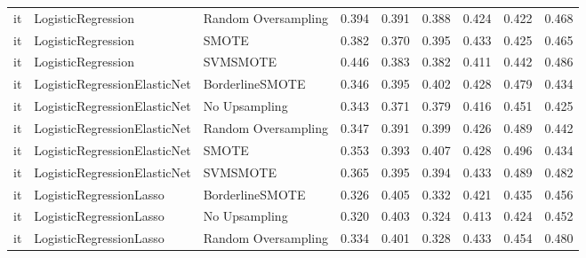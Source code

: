 \begin{tabular}{lllllllll}
      it &              LogisticRegression &           Random Oversampling & 0.394 &                     0.391 &                 0.388 &                  0.424 &                                   0.422 &     0.468 \\
      it &              LogisticRegression &                         SMOTE & 0.382 &                     0.370 &                 0.395 &                  0.433 &                                   0.425 &     0.465 \\
      it &              LogisticRegression &                      SVMSMOTE & 0.446 &                     0.383 &                 0.382 &                  0.411 &                                   0.442 &     0.486 \\
      it &    LogisticRegressionElasticNet &               BorderlineSMOTE & 0.346 &                     0.395 &                 0.402 &                  0.428 &                                   0.479 &     0.434 \\
      it &    LogisticRegressionElasticNet &                 No Upsampling & 0.343 &                     0.371 &                 0.379 &                  0.416 &                                   0.451 &     0.425 \\
      it &    LogisticRegressionElasticNet &           Random Oversampling & 0.347 &                     0.391 &                 0.399 &                  0.426 &                                   0.489 &     0.442 \\
      it &    LogisticRegressionElasticNet &                         SMOTE & 0.353 &                     0.393 &                 0.407 &                  0.428 &                                   0.496 &     0.434 \\
      it &    LogisticRegressionElasticNet &                      SVMSMOTE & 0.365 &                     0.395 &                 0.394 &                  0.433 &                                   0.489 &     0.482 \\
      it &         LogisticRegressionLasso &               BorderlineSMOTE & 0.326 &                     0.405 &                 0.332 &                  0.421 &                                   0.435 &     0.456 \\
      it &         LogisticRegressionLasso &                 No Upsampling & 0.320 &                     0.403 &                 0.324 &                  0.413 &                                   0.424 &     0.452 \\
      it &         LogisticRegressionLasso &           Random Oversampling & 0.334 &                     0.401 &                 0.328 &                  0.433 &                                   0.454 &     0.480 \\

\end{tabular}
